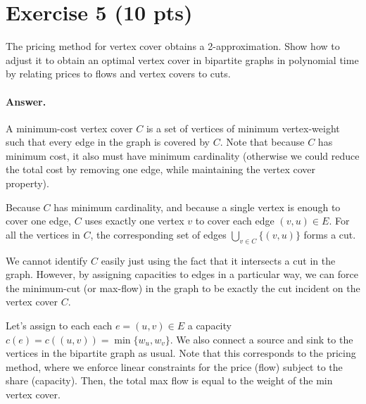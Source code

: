 \documentclass[a4paper]{article}
\begin{document}
\section*{Exercise 5 (10 pts)}

The pricing method for vertex cover obtains a 2-approximation. Show how to adjust it to obtain an optimal vertex cover in bipartite graphs in polynomial time by relating prices to flows and vertex covers to cuts.

\paragraph{Answer.}

A minimum-cost vertex cover $C$ is a set of vertices of minimum vertex-weight such that every edge in the graph is covered by $C$. Note that because $C$ has minimum cost, it also must have minimum cardinality (otherwise we could reduce the total cost by removing one edge, while maintaining the vertex cover property).

	\medskip

	Because $C$ has minimum cardinality, and because a single vertex is enough to cover one edge, $C$ uses exactly one vertex $v$ to cover each edge $(v,u) \in E$. For all the vertices in $C$, the corresponding set of edges $\bigcup_{v \in C}\{(v,u)\}$ forms a cut.
	
	\medskip
	
	We cannot identify $C$ easily just using the fact that it intersects a cut in the graph. However, by assigning capacities to edges in a particular way, we can force the minimum-cut (or max-flow) in the graph to be exactly the cut incident on the vertex cover $C$.

	Let's assign to each each $e = (u,v) \in E$ a capacity $c(e) = c((u,v)) = \min\{w_u, w_v\}$. We also connect a source and sink to the vertices in the  bipartite graph as usual. Note that this corresponds to the pricing method, where we enforce linear constraints for the price (flow) subject to the share (capacity).
	Then, the total max flow is equal to the weight of the min vertex cover.
\end{document}
